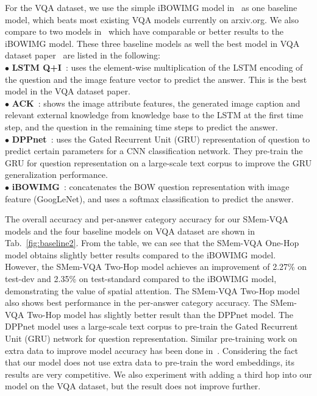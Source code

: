 For the VQA dataset, we use the simple iBOWIMG model in~\cite{zhou2015simple} as one baseline model, which beats most existing VQA models currently on arxiv.org. We also compare to two models in~\cite{wu2015ask}\cite{noh2015image} which have comparable or better results to the iBOWIMG model. These three baseline models as well the best model in VQA dataset paper~\cite{DBLP:journals/corr/AntolALMBZP15} are listed in the following:\\
{$\bullet$} {\bf{LSTM Q+I}}~\cite{DBLP:journals/corr/AntolALMBZP15}: uses the element-wise multiplication of the LSTM encoding of the question and the image feature vector to predict the answer. This is the best model in the VQA dataset paper.\\
{$\bullet$} {\bf{ACK}}~\cite{wu2015ask}: shows the image attribute features, the generated image caption and relevant external knowledge from knowledge base to the LSTM at the first time step, and the question in the remaining time steps to predict the answer.\\
{$\bullet$} {\bf{DPPnet}}~\cite{noh2015image}: uses the Gated Recurrent Unit (GRU) representation of question to predict certain parameters for a CNN classification network. They pre-train the GRU for question representation on a large-scale text corpus to improve the GRU generalization performance.\\
{$\bullet$} {\bf{iBOWIMG}}~\cite{zhou2015simple}: concatenates the BOW question representation with image feature (GoogLeNet), and uses a softmax classification to predict the answer. 

The overall accuracy and per-answer category accuracy for our SMem-VQA models and the four baseline models on VQA dataset are shown in Tab.~\ref{fig:baseline2}. From the table, we can see that the SMem-VQA One-Hop model obtains slightly better results compared to the iBOWIMG model. However, the SMem-VQA Two-Hop model achieves an improvement of 2.27\% on test-dev and 2.35\% on test-standard compared to the iBOWIMG model, demonstrating the value of spatial attention. The SMem-VQA Two-Hop model also shows best performance in the per-answer category accuracy. 
The SMem-VQA Two-Hop model has slightly better result than the DPPnet model. 
The DPPnet model uses a large-scale text corpus to pre-train the Gated Recurrent Unit (GRU) network for question representation.
Similar pre-training work on extra data to improve model accuracy has been done in~\cite{venugopalan2014translating}.
Considering the fact that our model does not use extra data to pre-train the word embeddings, its results are very competitive.
We also experiment with adding a third hop into our model on the VQA dataset, but the result does not improve further.

